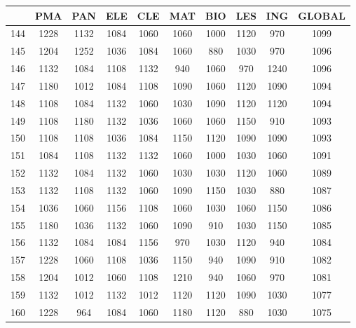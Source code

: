 \documentclass{article}
\begin{document}
\begin{table}
\centering
\begin{tabular}{c|c|c|c|c|c|c|c|c|c|}
\cline{2-10}
& \textbf{PMA} & \textbf{PAN} & \textbf{ELE} & \textbf{CLE} & \textbf{MAT} & \textbf{BIO} & \textbf{LES} & \textbf{ING} & \textbf{GLOBAL} \\ \hline
\multicolumn{1}{|c|}{144} & 1228 & 1132 & 1084 & 1060 & 1060 & 1000 & 1120 & 970  & 1099 \\ \hline
\multicolumn{1}{|c|}{145} & 1204 & 1252 & 1036 & 1084 & 1060 & 880  & 1030 & 970  & 1096 \\ \hline
\multicolumn{1}{|c|}{146} & 1132 & 1084 & 1108 & 1132 & 940  & 1060 & 970  & 1240 & 1096 \\ \hline
\multicolumn{1}{|c|}{147} & 1180 & 1012 & 1084 & 1108 & 1090 & 1060 & 1120 & 1090 & 1094 \\ \hline
\multicolumn{1}{|c|}{148} & 1108 & 1084 & 1132 & 1060 & 1030 & 1090 & 1120 & 1120 & 1094 \\ \hline
\multicolumn{1}{|c|}{149} & 1108 & 1180 & 1132 & 1036 & 1060 & 1060 & 1150 & 910  & 1093 \\ \hline
\multicolumn{1}{|c|}{150} & 1108 & 1108 & 1036 & 1084 & 1150 & 1120 & 1090 & 1090 & 1093 \\ \hline
\multicolumn{1}{|c|}{151} & 1084 & 1108 & 1132 & 1132 & 1060 & 1000 & 1030 & 1060 & 1091 \\ \hline
\multicolumn{1}{|c|}{152} & 1132 & 1084 & 1132 & 1060 & 1030 & 1030 & 1120 & 1060 & 1089 \\ \hline
\multicolumn{1}{|c|}{153} & 1132 & 1108 & 1132 & 1060 & 1090 & 1150 & 1030 & 880  & 1087 \\ \hline
\multicolumn{1}{|c|}{154} & 1036 & 1060 & 1156 & 1108 & 1060 & 1030 & 1060 & 1150 & 1086 \\ \hline
\multicolumn{1}{|c|}{155} & 1180 & 1036 & 1132 & 1060 & 1090 & 910  & 1030 & 1150 & 1085 \\ \hline
\multicolumn{1}{|c|}{156} & 1132 & 1084 & 1084 & 1156 & 970  & 1030 & 1120 & 940  & 1084 \\ \hline
\multicolumn{1}{|c|}{157} & 1228 & 1060 & 1108 & 1036 & 1150 & 940  & 1090 & 910  & 1082 \\ \hline
\multicolumn{1}{|c|}{158} & 1204 & 1012 & 1060 & 1108 & 1210 & 940  & 1060 & 970  & 1081 \\ \hline
\multicolumn{1}{|c|}{159} & 1132 & 1012 & 1132 & 1012 & 1120 & 1120 & 1090 & 1030 & 1077 \\ \hline
\multicolumn{1}{|c|}{160} & 1228 & 964  & 1084 & 1060 & 1180 & 1120 & 880  & 1030 & 1075 \\ \hline

\end{tabular}
\end{table}
\end{document}
